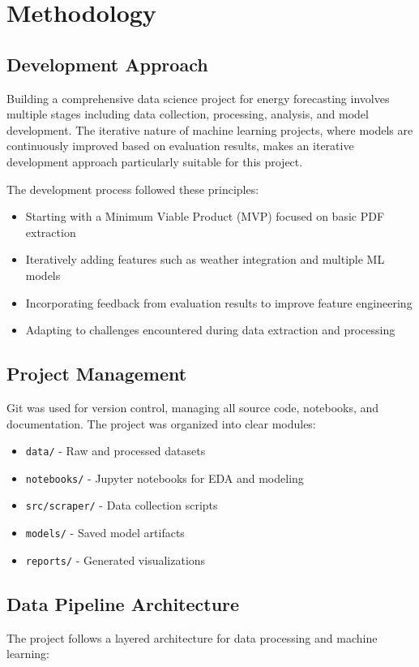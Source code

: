 \chapter{Methodology}
	\section{Development Approach}
	Building a comprehensive data science project for energy forecasting involves multiple stages including data collection, processing, analysis, and model development. The iterative nature of machine learning projects, where models are continuously improved based on evaluation results, makes an iterative development approach particularly suitable for this project.

	The development process followed these principles:
	\begin{itemize}
		\item Starting with a Minimum Viable Product (MVP) focused on basic PDF extraction
		\item Iteratively adding features such as weather integration and multiple ML models
		\item Incorporating feedback from evaluation results to improve feature engineering
		\item Adapting to challenges encountered during data extraction and processing
	\end{itemize}

	\section{Project Management}
	Git was used for version control, managing all source code, notebooks, and documentation. The project was organized into clear modules:
	\begin{itemize}
		\item \texttt{data/} - Raw and processed datasets
		\item \texttt{notebooks/} - Jupyter notebooks for EDA and modeling
		\item \texttt{src/scraper/} - Data collection scripts
		\item \texttt{models/} - Saved model artifacts
		\item \texttt{reports/} - Generated visualizations
	\end{itemize}

	\section{Data Pipeline Architecture}
	The project follows a layered architecture for data processing and machine learning:

